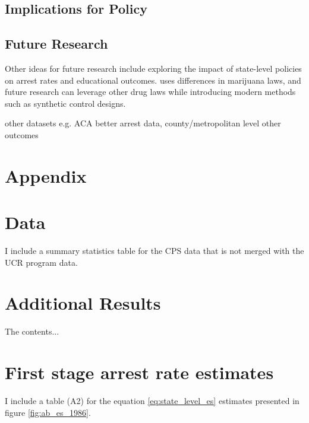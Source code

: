 \documentclass{article}
\begin{document}
\subsection{Implications for Policy}

\subsection{Future Research}

Other ideas for future research include exploring the impact of state-level policies on arrest rates and educational outcomes. \cite{britton2022} uses differences in marijuana laws, and future research can leverage other drug laws while introducing modern methods such as synthetic control designs.

other datasets e.g. ACA
better arrest data, county/metropolitan level
other outcomes



\clearpage



\clearpage



\clearpage



\clearpage

\clearpage
\appendix
\section*{Appendix}
\beginsupplement


  \section{Data}
  I include a summary statistics table for the CPS data that is not merged with the UCR program data.

  \section{Additional Results}
  The contents...
  \section{First stage arrest rate estimates}
  I include a table (A2) for the equation \ref{eq:state_level_es} estimates presented in figure \ref{fig:ab_es_1986}.
\end{document}
